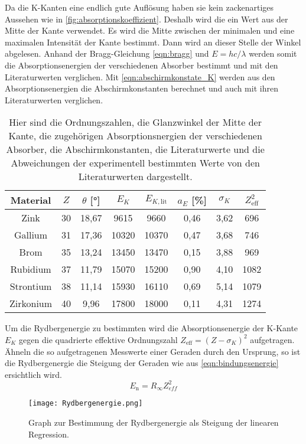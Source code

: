 \documentclass[titlepage = firstcover]{scrartcl}
\begin{document}
        Da die K-Kanten eine endlich gute Auflösung haben sie kein zackenartiges Aussehen wie in \autoref{fig:absorptionskoeffizient}. Deshalb wird die ein Wert aus der Mitte der Kante verwendet. Es wird die Mitte zwischen der minimalen und eine maximalen Intensität der Kante bestimmt. Dann wird an dieser Stelle der Winkel abgelesen. Anhand der Bragg-Gleichung \ref{eqn:bragg} und $E = hc/\lambda$ werden somit die Absorptionsenergien der verschiedenen Absorber bestimmt und mit den Literaturwerten verglichen. Mit \autoref{eqn:abschirmkonstate_K} werden aus den Absorptionsenergien die Abschirmkonstanten berechnet und auch mit ihren Literaturwerten verglichen.
        \begin{table}[h]
          \centering
          \caption{Hier sind die Ordnungszahlen, die Glanzwinkel der Mitte der Kante, die zugehörigen Absorptionsnergien der verschiedenen Absorber, die Abschirmkonstanten, die Literaturwerte und die Abweichungen der experimentell bestimmten Werte von den Literaturwerten dargestellt.}
          \label{tab:absober}
          \begin{tabular}{c c c c c c c c}
            \toprule
            Material & $Z$ & $\theta$ [°] & $E_K$ & $E_{K,\text{lit}}$ & $a_{E}$ [\%] & $\sigma_K$ & $Z_\text{eff}^2$ \\
            \midrule
            Zink      & 30 & 18,67 & 9615  & 9660  & 0,46 & 3,62 & 696  \\
            Gallium   & 31 & 17,36 & 10320 & 10370 & 0,47 & 3,68 & 746  \\
            Brom      & 35 & 13,24 & 13450 & 13470 & 0,15 & 3,88 & 969  \\
            Rubidium  & 37 & 11,79 & 15070 & 15200 & 0,90 & 4,10 & 1082 \\
            Strontium & 38 & 11,14 & 15930 & 16110 & 0,69 & 5,14 & 1079 \\
            Zirkonium & 40 & 9,96  & 17800 & 18000 & 0,11 & 4,31 & 1274 \\
            \bottomrule
          \end{tabular}
        \end{table}
        \FloatBarrier

        Um die Rydbergenergie zu bestimmten wird die Absorptionsenergie der K-Kante $E_K$ gegen die quadrierte effektive Ordnungszahl $Z_{\text{eff}} = (Z - \sigma_K)^2$ aufgetragen. Ähneln die so aufgetragenen Messwerte einer Geraden durch den Ursprung, so ist die Rydbergenergie die Steigung der Geraden wie aus \autoref{eqn:bindungsenergie} ersichtlich wird.
        \begin{equation*}
          E_\text{n} = R_{\infty} Z^2_{eff}
        \end{equation*}
        \begin{figure}
          \centering
          \texttt{[image: Rydbergenergie.png]}
          \caption{Graph zur Bestimmung der Rydbergenergie als Steigung der linearen Regression.}
          \label{fig:rydbergenergie}
        \end{figure}
        \FloatBarrier
\end{document}
